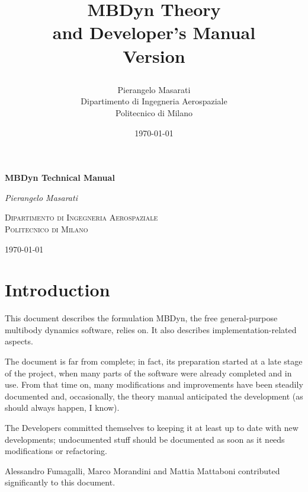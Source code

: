 \documentclass[10pt,fleqn,subeqn]{report}
\begin{document}
\begin{latexonly}
\title{\bf MBDyn Theory \\ and Developer's Manual \\
Version

}
\author{Pierangelo Masarati \vspace{5mm}\\
    \sc Dipartimento di Ingegneria Aerospaziale \\
    \sc Politecnico di Milano}
\date{\today}
\maketitle
\end{latexonly}

\begin{htmlonly}
\begin{center}
\textbf{\LARGE MBDyn Technical Manual}

\emph{\large Pierangelo Masarati}

\textsc{Dipartimento di Ingegneria Aerospaziale \\ Politecnico di Milano}

\today
\end{center}
\end{htmlonly}




\tableofcontents
\newpage
\listoffigures
\newpage
\listoftables
\newpage



\chapter{Introduction}
This document describes the formulation MBDyn,
the free general-purpose multibody dynamics software,
relies on.
It also describes implementation-related aspects.

The document is far from complete; in fact, its preparation
started at a late stage of the project, when many parts
of the software were already completed and in use.
From that time on, many modifications and improvements
have been steadily documented and, occasionally,
the theory manual anticipated the development
(as should always happen, I know).

The Developers committed themselves to keeping it at least up to date
with new developments; undocumented stuff should be documented
as soon as it needs modifications or refactoring.

Alessandro Fumagalli, Marco Morandini and Mattia Mattaboni
contributed significantly to this document.
\end{document}
